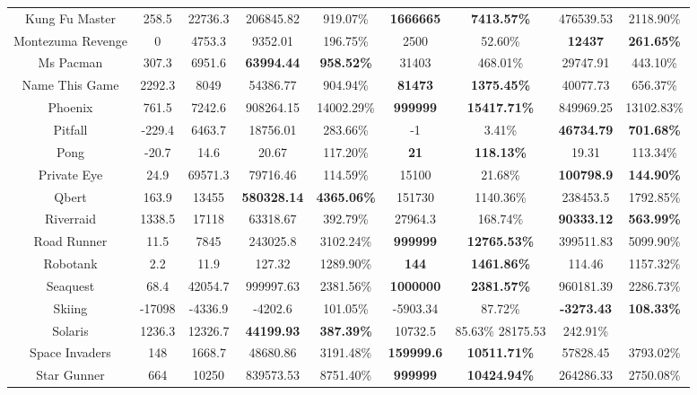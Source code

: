 \begin{table}[!hb]
\begin{center}
\begin{tabular}{c c c c c c c cc}
        Kung Fu Master & 258.5 & 22736.3 & 206845.82 & 919.07\% & \textbf{1666665} & \textbf{7413.57\%} & 476539.53	& 2118.90\%\\  
        Montezuma Revenge & 0 & 4753.3 & 9352.01 & 196.75\%& 2500 & 52.60\% & \textbf{12437}	& \textbf{261.65\%}\\  
        Ms Pacman & 307.3 & 6951.6 & \textbf{63994.44} & \textbf{958.52\%} & 31403 & 468.01\% & 29747.91	& 443.10\%\\  
        Name This Game & 2292.3 & 8049 & 54386.77 & 904.94\% & \textbf{81473} & \textbf{1375.45\%} & 40077.73	& 656.37\%\\  
        Phoenix & 761.5 & 7242.6 & 908264.15 & 14002.29\% & \textbf{999999} & \textbf{15417.71\%} & 849969.25	&13102.83\%\\  
        Pitfall & -229.4 & 6463.7 & 18756.01 & 283.66\% & -1 & 3.41\% & \textbf{46734.79}	& \textbf{701.68\%}\\  
        Pong & -20.7 & 14.6 & 20.67 & 117.20\% & \textbf{21} & \textbf{118.13\%} & 19.31	& 113.34\%\\  
        Private Eye & 24.9 & 69571.3 & 79716.46 & 114.59\% & 15100 & 21.68\% & \textbf{100798.9}	& \textbf{144.90\%}\\  
        Qbert & 163.9 & 13455 & \textbf{580328.14} & \textbf{4365.06\%} & 151730 & 1140.36\% & 238453.5	& 1792.85\%\\  
        Riverraid & 1338.5 & 17118 & 63318.67 & 392.79\% & 27964.3 & 168.74\% & \textbf{90333.12}	& \textbf{563.99\%}\\  
        Road Runner & 11.5 & 7845 & 243025.8 & 3102.24\% & \textbf{999999} & \textbf{12765.53\%} & 399511.83	& 5099.90\%\\  
        Robotank & 2.2 & 11.9 & 127.32 & 1289.90\% & \textbf{144} & \textbf{1461.86\%} & 114.46	& 1157.32\%\\  
        Seaquest & 68.4 & 42054.7 & 999997.63 & 2381.56\% & \textbf{1000000} & \textbf{2381.57\%} & 960181.39	& 2286.73\%\\  
        Skiing & -17098 & -4336.9 & -4202.6 &101.05\%& -5903.34 & 87.72\% & \textbf{-3273.43}	&\textbf{108.33\%}\\  
        Solaris & 1236.3 & 12326.7 & \textbf{44199.93} & \textbf{387.39\%} & 10732.5 & 85.63\% 28175.53	& 242.91\%\\  
        Space Invaders & 148 & 1668.7 & 48680.86 & 3191.48\% & \textbf{159999.6} & \textbf{10511.71\%} & 57828.45	& 3793.02\%\\  
        Star Gunner & 664 & 10250 & 839573.53 & 8751.40\% & \textbf{999999} & \textbf{10424.94\%} & 264286.33	&2750.08\%\\  

\end{tabular}
\end{center}
\end{table}
